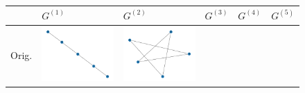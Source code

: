 \documentclass[11pt,a4paper,openright,oneside]{book}
\numberwithin{equation}{section}
\begin{document}
{\begin{figure}[h]
\begin{adjustwidth}{-3cm}{-3cm}
    \centering
    \def\arraystretch{1.15}
\begin{tabular}{>{\centering\arraybackslash}m{1.5cm} m{2.5cm} m{2.5cm} m{2.5cm} m{2.5cm} m{2.5cm}}
        & \centering $G^{(1)}$ & \centering $G^{(2)}$ & \centering $G^{(3)}$ & \centering $G^{(4)}$ & \centering $G^{(5)}$ & \\ \hline
        Orig. &
        \rule{0pt}{0.01cm} \includegraphics[width=\linewidth]{media/tnale/graph-1.png} \rule{0pt}{0.01cm} & 
        \rule{0pt}{0.01cm} \includegraphics[width=\linewidth]{media/tnale/graph-2.png} \rule{0pt}{0.01cm} &

\end{tabular}
\end{adjustwidth}
\end{figure}}
\end{document}
